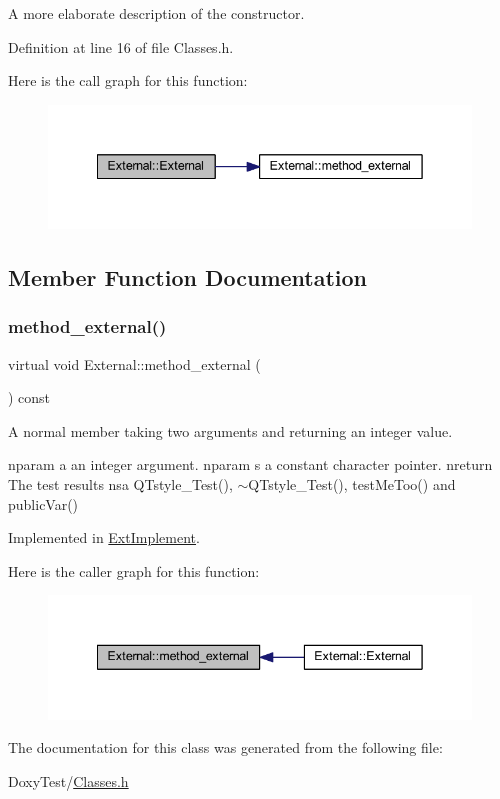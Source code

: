 A more elaborate description of the constructor. 

Definition at line 16 of file Classes.\+h.

Here is the call graph for this function\+:
\nopagebreak
\begin{figure}[H]
\begin{center}
\leavevmode
\includegraphics[width=342pt]{class_external_ad2872b94971bb19971df29b1c04036fc_cgraph}
\end{center}
\end{figure}


\subsection{Member Function Documentation}
\mbox{\label{class_external_a6bda85aa1f6f1396469261bd13d39e72}} 
\subsubsection{\texorpdfstring{method\+\_\+external()}{method\_external()}}
{\footnotesize\ttfamily virtual void External\+::method\+\_\+external (\begin{DoxyParamCaption}{ }\end{DoxyParamCaption}) const\hspace{0.3cm}{\ttfamily [pure virtual]}}



A normal member taking two arguments and returning an integer value. 

nparam a an integer argument. nparam s a constant character pointer. nreturn The test results nsa Q\+Tstyle\+\_\+\+Test(), $\sim$\+Q\+Tstyle\+\_\+\+Test(), test\+Me\+Too() and public\+Var() 

Implemented in \hyperlink{class_ext_implement_a5f41afb83e49e92542b031aecfd097a9}{Ext\+Implement}.

Here is the caller graph for this function\+:
\nopagebreak
\begin{figure}[H]
\begin{center}
\leavevmode
\includegraphics[width=342pt]{class_external_a6bda85aa1f6f1396469261bd13d39e72_icgraph}
\end{center}
\end{figure}


The documentation for this class was generated from the following file\+:\begin{DoxyCompactItemize}
\item 
Doxy\+Test/\hyperlink{_classes_8h}{Classes.\+h}\end{DoxyCompactItemize}
